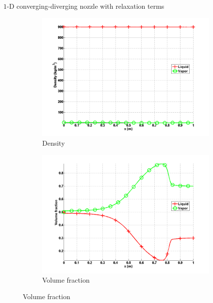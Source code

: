 \documentclass[xcolor=dvipsnames,10pt]{beamer}
\begin{document}
\begin{frame}{$1$-D converging-diverging nozzle with relaxation terms}
\begin{figure}[H]
\begin{subfigure}[b]{0.38\textwidth}
\centering
\includegraphics[width=\textwidth]{../figures/SEM/Aint1e4_two_phases_density.png}
\caption{Density}
\end{subfigure}
%
\begin{subfigure}[b]{0.38\textwidth}
\centering
\includegraphics[width=\textwidth]{../figures/SEM/Aint1e4_two_phases_volume_fraction.png}
\caption{Volume fraction}
\end{subfigure}
\end{figure}
\end{frame}
\end{document}
